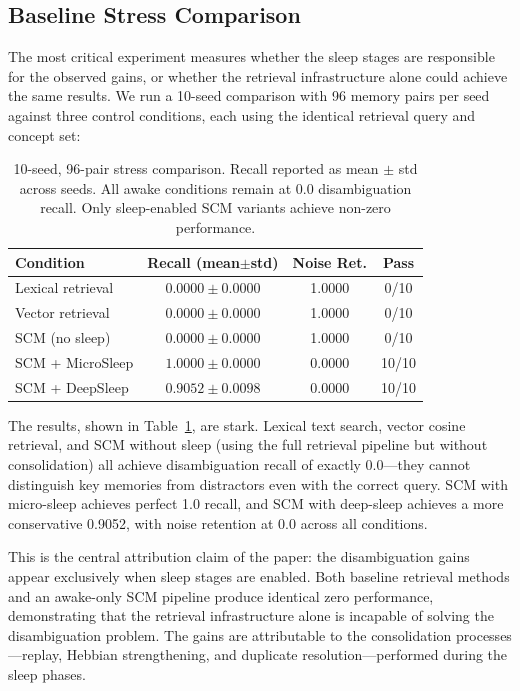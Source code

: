 \documentclass[11pt,twocolumn]{article}
\begin{document}
\subsection{Baseline Stress Comparison}

The most critical experiment measures whether the sleep stages are responsible for the observed gains, or whether the retrieval infrastructure alone could achieve the same results. We run a 10-seed comparison with 96 memory pairs per seed against three control conditions, each using the identical retrieval query and concept set:

\begin{table}[t]
\centering
\caption{10-seed, 96-pair stress comparison. Recall reported as mean $\pm$ std across seeds. All awake conditions remain at 0.0 disambiguation recall. Only sleep-enabled SCM variants achieve non-zero performance.}
\label{tab:stress}
{\footnotesize
\begin{tabular}{@{}lccc@{}}
\toprule
\textbf{Condition} & \textbf{Recall (mean$\pm$std)} & \textbf{Noise Ret.} & \textbf{Pass} \\
\midrule
Lexical retrieval       & $0.0000 \pm 0.0000$ & 1.0000 & 0/10 \\
Vector retrieval        & $0.0000 \pm 0.0000$ & 1.0000 & 0/10 \\
SCM (no sleep)          & $0.0000 \pm 0.0000$ & 1.0000 & 0/10 \\
SCM + MicroSleep        & $1.0000 \pm 0.0000$ & 0.0000 & 10/10 \\
SCM + DeepSleep         & $0.9052 \pm 0.0098$ & 0.0000 & 10/10 \\
\bottomrule
\end{tabular}}
\end{table}

The results, shown in Table~\ref{tab:stress}, are stark. Lexical text search, vector cosine retrieval, and SCM without sleep (using the full retrieval pipeline but without consolidation) all achieve disambiguation recall of exactly 0.0---they cannot distinguish key memories from distractors even with the correct query. SCM with micro-sleep achieves perfect 1.0 recall, and SCM with deep-sleep achieves a more conservative 0.9052, with noise retention at 0.0 across all conditions.

This is the central attribution claim of the paper: the disambiguation gains appear exclusively when sleep stages are enabled. Both baseline retrieval methods and an awake-only SCM pipeline produce identical zero performance, demonstrating that the retrieval infrastructure alone is incapable of solving the disambiguation problem. The gains are attributable to the consolidation processes---replay, Hebbian strengthening, and duplicate resolution---performed during the sleep phases.
\end{document}
